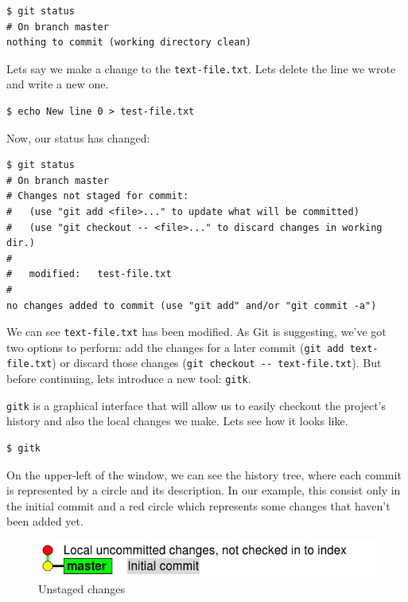 \documentclass[a4paper,10pt]{article}
\newenvironment{terminal}
  {
    \vspace{+10pt}
    \begin{center}
    \begin{minipage}{0.95\textwidth}
    \begin{framed}
  }
  {
    \end{framed}
    \end{minipage}
    \end{center}
    \vspace{+10pt}
  }
\begin{document}
\begin{terminal}
\begin{verbatim}
$ git status
# On branch master
nothing to commit (working directory clean)
\end{verbatim}%
\end{terminal}

Lets say we make a change to the \texttt{text-file.txt}. Lets delete the
line we wrote and write a new one.

\begin{terminal}
\begin{verbatim}
$ echo New line 0 > test-file.txt
\end{verbatim}%
\end{terminal}

Now, our status has changed:

\begin{terminal}
\begin{verbatim}
$ git status
# On branch master
# Changes not staged for commit:
#   (use "git add <file>..." to update what will be committed)
#   (use "git checkout -- <file>..." to discard changes in working dir.)
#
#	modified:   test-file.txt
#
no changes added to commit (use "git add" and/or "git commit -a")
\end{verbatim}%
\end{terminal}

We can see \texttt{text-file.txt} has been modified. As Git is
suggesting, we've got two options to perform: add the changes for a
later commit (\texttt{git add text-file.txt}) or discard those changes
(\texttt{git checkout -{}- text-file.txt}). But before continuing, lets
introduce a new tool: \texttt{gitk}.

\texttt{gitk} is a graphical interface that will allow us to easily
checkout the project's history and also the local changes we make. Lets
see how it looks like.

\begin{terminal}
\begin{verbatim}
$ gitk
\end{verbatim}%
\end{terminal}

On the upper-left of the window, we can see the history tree, where
each commit is represented by a circle and its description. In our
example, this consist only in the initial commit and a red circle which
represents some changes that haven't been added yet.

\begin{figure}[h]
  \begin{center}
    \includegraphics[scale=0.5]{git_example-00}
  \end{center}
  \caption{Unstaged changes}
\end{figure}
\end{document}
